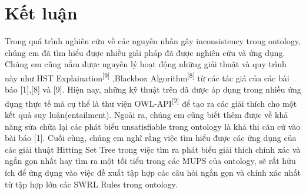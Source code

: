 \chapter{Kết luận}
Trong quá trình nghiên cứu về các nguyên nhân gây inconsistency trong ontology, chúng em đã tìm hiểu được nhiều giải pháp đã được nghiên cứu và ứng dụng. Chúng em cũng nắm được nguyên lý hoạt động những giải thuật và quy trình này như HST Explaination\textsuperscript{[9]} ,Blackbox Algorithm\textsuperscript{[8]} từ các tác giả của các bài báo [1],[8] và [9]. Hiện nay, những kỹ thuật trên đã được áp dụng trong nhiều ứng dụng thực tế mà cụ thể là thư viện OWL-API\textsuperscript{[2]} để tạo ra các giải thích cho một kết quả suy luận(entailment). Ngoài ra, chúng em cũng biết thêm được về khả năng sửa chữa lại các phát biểu unsatisfiable trong ontology là khả thi căn cứ vào bài báo [1]. Cuối cùng, chúng em nghĩ rằng việc tìm hiểu được các ứng dụng của các giải thuật Hitting Set Tree trong việc tìm ra phát biểu giải thích chính xác và ngắn gọn nhất hay tìm ra một tối tiểu trong các MUPS của ontology, sẽ rất hữu ích để ứng dụng vào việc đề xuất tập hợp các câu hỏi ngắn gọn và chính xác nhất từ tập hợp lớn các SWRL Rules trong ontology.
